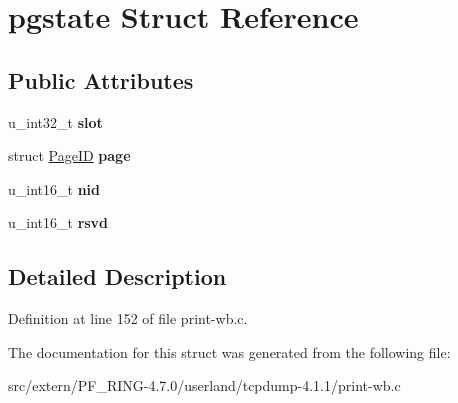 \hypertarget{structpgstate}{
\section{pgstate Struct Reference}
\label{structpgstate}
}
\subsection*{Public Attributes}
\begin{DoxyCompactItemize}
\item 
\hypertarget{structpgstate_ac75e184283890f3b987526ea60ccee1b}{
u\_\-int32\_\-t {\bfseries slot}}
\label{structpgstate_ac75e184283890f3b987526ea60ccee1b}

\item 
\hypertarget{structpgstate_ad0b0dd8fd7ae73be7135c30b5f365b9e}{
struct \hyperlink{struct_page_i_d}{PageID} {\bfseries page}}
\label{structpgstate_ad0b0dd8fd7ae73be7135c30b5f365b9e}

\item 
\hypertarget{structpgstate_a68d14abe7652efc26aac384c59289543}{
u\_\-int16\_\-t {\bfseries nid}}
\label{structpgstate_a68d14abe7652efc26aac384c59289543}

\item 
\hypertarget{structpgstate_acde35de190aa20f2a9e401205cdc41cd}{
u\_\-int16\_\-t {\bfseries rsvd}}
\label{structpgstate_acde35de190aa20f2a9e401205cdc41cd}

\end{DoxyCompactItemize}


\subsection{Detailed Description}


Definition at line 152 of file print-\/wb.c.



The documentation for this struct was generated from the following file:\begin{DoxyCompactItemize}
\item 
src/extern/PF\_\-RING-\/4.7.0/userland/tcpdump-\/4.1.1/print-\/wb.c\end{DoxyCompactItemize}
